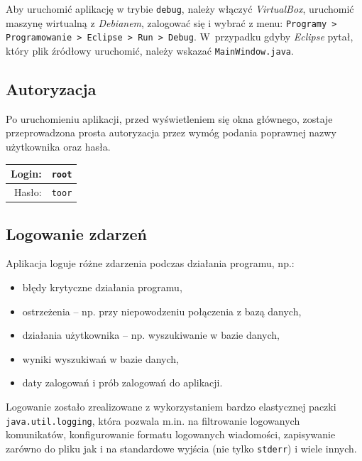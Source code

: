 \documentclass[a4paper,titlepage]{article}
\theoremstyle{break}
\numberwithin{equation}{subsection}
\begin{document}
Aby uruchomić aplikację w trybie \texttt{debug}, należy włączyć \emph{VirtualBox}, uruchomić maszynę wirtualną z \emph{Debianem}, zalogować się i wybrać z menu: \texttt{Programy > Programowanie > Eclipse > Run > Debug}. W~przypadku gdyby \emph{Eclipse} pytał, który plik źródłowy uruchomić, należy wskazać \texttt{MainWindow.java}.


\subsection{Autoryzacja}

Po uruchomieniu aplikacji, przed wyświetleniem się okna głównego, zostaje przeprowadzona prosta autoryzacja przez wymóg podania poprawnej nazwy użytkownika oraz hasła.

\begin{tabular}{r|l}
Login: & \texttt{root}\\
\hline
Hasło: & \texttt{toor}\\
\end{tabular}


\subsection{Logowanie zdarzeń}
\label{sec:logowanie}

Aplikacja loguje różne zdarzenia podczas działania programu, np.:
\begin{itemize}
	\item błędy krytyczne działania programu,
	\item ostrzeżenia -- np. przy niepowodzeniu połączenia z bazą danych,
	\item działania użytkownika -- np. wyszukiwanie w bazie danych,
	\item wyniki wyszukiwań w bazie danych,
	\item daty zalogowań i prób zalogowań do aplikacji.
\end{itemize}
Logowanie zostało zrealizowane z wykorzystaniem bardzo elastycznej paczki \texttt{java.util.logging}, która pozwala m.in. na filtrowanie logowanych komunikatów, konfigurowanie formatu logowanych wiadomości, zapisywanie zarówno do pliku jak i na standardowe wyjścia (nie tylko \texttt{stderr}) i wiele innych.
\end{document}
